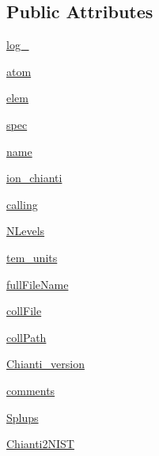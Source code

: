 \subsection*{Public Attributes}
\begin{DoxyCompactItemize}
\item 
\hyperlink{classpyneb_1_1utils_1_1pn__chianti_1_1___coll_chianti_a1bb28a8bbcbca5499d0588860cd4280f}{log\-\_\-}
\item 
\hyperlink{classpyneb_1_1utils_1_1pn__chianti_1_1___coll_chianti_a904418982790fd63f2324fec90636bb6}{atom}
\item 
\hyperlink{classpyneb_1_1utils_1_1pn__chianti_1_1___coll_chianti_a83fc37382d9eb03922e67dacc6ca66d0}{elem}
\item 
\hyperlink{classpyneb_1_1utils_1_1pn__chianti_1_1___coll_chianti_a665d7e8537b9ccec445bde02d78f8e93}{spec}
\item 
\hyperlink{classpyneb_1_1utils_1_1pn__chianti_1_1___coll_chianti_ac2de9885177db13b72b7f9a937cc3544}{name}
\item 
\hyperlink{classpyneb_1_1utils_1_1pn__chianti_1_1___coll_chianti_af0f28fb84d1ceb9d64e40429c981a6f6}{ion\-\_\-chianti}
\item 
\hyperlink{classpyneb_1_1utils_1_1pn__chianti_1_1___coll_chianti_ab58a9cfcb76b7c72b9b815c5700e7aae}{calling}
\item 
\hyperlink{classpyneb_1_1utils_1_1pn__chianti_1_1___coll_chianti_a453595ef60eae9d063e2a24ef43002f5}{N\-Levels}
\item 
\hyperlink{classpyneb_1_1utils_1_1pn__chianti_1_1___coll_chianti_ac8f0c1513ef4a2f2d12c59fa380a495c}{tem\-\_\-units}
\item 
\hyperlink{classpyneb_1_1utils_1_1pn__chianti_1_1___coll_chianti_abe0d4b4734d0426b2053329f466793c4}{full\-File\-Name}
\item 
\hyperlink{classpyneb_1_1utils_1_1pn__chianti_1_1___coll_chianti_aafcdb306ebd11d4b89fd80923a8d69c9}{coll\-File}
\item 
\hyperlink{classpyneb_1_1utils_1_1pn__chianti_1_1___coll_chianti_af593f39e6cd3d3def54951d5c5f9a400}{coll\-Path}
\item 
\hyperlink{classpyneb_1_1utils_1_1pn__chianti_1_1___coll_chianti_af02b0dfb67aec7e96a92b42f2ba26699}{Chianti\-\_\-version}
\item 
\hyperlink{classpyneb_1_1utils_1_1pn__chianti_1_1___coll_chianti_acd3ca55d5ead72cdfd0c8cf718898d0e}{comments}
\item 
\hyperlink{classpyneb_1_1utils_1_1pn__chianti_1_1___coll_chianti_abbdbf5533a480f46baceccc2885d7467}{Splups}
\item 
\hyperlink{classpyneb_1_1utils_1_1pn__chianti_1_1___coll_chianti_a1d2846276b84d8ec47c08b7d32eb7756}{Chianti2\-N\-I\-S\-T}
\end{DoxyCompactItemize}

